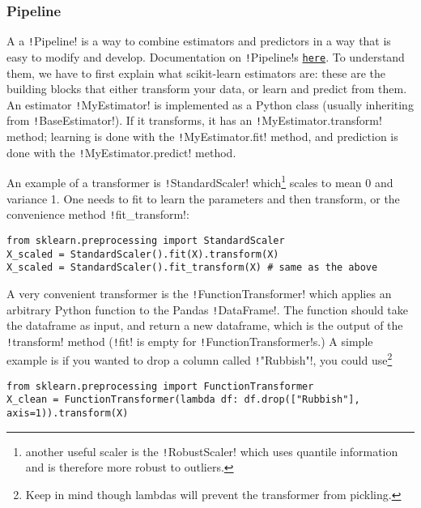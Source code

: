 \documentclass[11pt]{article}
\theoremstyle{definition}
\newcommand{\myhref}[2]{\href{#1}{\texttt{#2}}}
\begin{document}
\subsubsection{Pipeline}
A a \texttt!Pipeline! is a way to combine estimators and predictors in a way that is easy to modify and develop. Documentation on \texttt!Pipeline!s \myhref{https://scikit-learn.org/stable/modules/compose.html\#build-a-pipeline}{here}. To understand them, we have to first explain what scikit-learn estimators are: these are the building blocks that either transform your data, or learn and predict from them. 
An estimator \texttt!MyEstimator! is implemented as a Python class (usually inheriting from \texttt!BaseEstimator!). 
If it transforms, it has an \texttt!MyEstimator.transform! method;
learning is done with the \texttt!MyEstimator.fit! method, and
prediction is done with the \texttt!MyEstimator.predict! method. 

An example of a transformer is \texttt!StandardScaler! which\footnote{another useful scaler is the \texttt!RobustScaler! which uses quantile information and is therefore more robust to outliers.} scales to mean 0 and variance 1. 
One needs to fit to learn the parameters and then transform, or the convenience method \texttt!fit_transform!:
\begin{verbatim}
from sklearn.preprocessing import StandardScaler
X_scaled = StandardScaler().fit(X).transform(X) 
X_scaled = StandardScaler().fit_transform(X) # same as the above
\end{verbatim}
A very convenient transformer is the \texttt!FunctionTransformer! which applies an arbitrary Python function to the Pandas \texttt!DataFrame!. The function should take the dataframe as input, and return a new dataframe, which is the output of the \texttt!transform! method (\texttt!fit! is empty for \texttt!FunctionTransformer!s.) A simple example is if you wanted to drop a column called \texttt!"Rubbish"!, you could use\footnote{Keep in mind though lambdas will prevent the transformer from pickling.}
\begin{verbatim}
from sklearn.preprocessing import FunctionTransformer
X_clean = FunctionTransformer(lambda df: df.drop(["Rubbish"], axis=1)).transform(X)
\end{verbatim}
\end{document}
